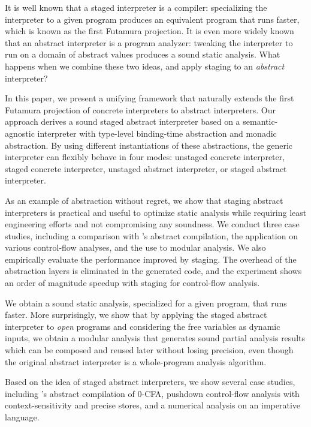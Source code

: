 It is well known that a staged interpreter is a compiler: specializing the
interpreter to a given program produces an equivalent program that runs faster,
which is known as the first Futamura projection. It is even more widely known that an
abstract interpreter is a program analyzer: tweaking the interpreter to run on a
domain of abstract values produces a sound static analysis. What happens when we
combine these two ideas, and apply staging to an \emph{abstract} interpreter?

In this paper, we present a unifying framework that naturally extends the first
Futamura projection of concrete interpreters to abstract interpreters. Our
approach derives a sound staged abstract interpreter based on a
semantic-agnostic interpreter with type-level binding-time abstraction and
monadic abstraction. By using different instantiations of these abstractions,
the generic interpreter can flexibly behave in four modes: unstaged concrete
interpreter, staged concrete interpreter, unstaged abstract interpreter, or
staged abstract interpreter.

As an example of abstraction without regret, we show that staging abstract
interpreters is practical and useful to optimize static analysis while requiring
least engineering efforts and not compromising any soundness. We conduct three
case studies, including a comparison with
\citeauthor{Boucher:1996:ACN:647473.727587}'s abstract compilation,
the application on various control-flow analyses, and the use to modular
analysis. We also empirically evaluate the performance improved by staging. The
overhead of the abstraction layers is eliminated in the generated code, and the 
experiment shows an order of magnitude speedup with staging for control-flow analysis.

\iffalse
We obtain a sound static analysis, specialized for
a given program, that runs faster. More surprisingly, we show that by applying
the staged abstract interpreter to \textit{open} programs and considering the
free variables as dynamic inputs, we obtain a modular analysis that generates
sound partial analysis results which can be composed and reused later without
losing precision, even though the original abstract interpreter is a
whole-program analysis algorithm.

Based on the idea of staged abstract interpreters, we show several case studies,
including \citeauthor{Boucher:1996:ACN:647473.727587}'s abstract compilation of
0-CFA, pushdown control-flow analysis with context-sensitivity and precise
stores, and a numerical analysis on an imperative language.

